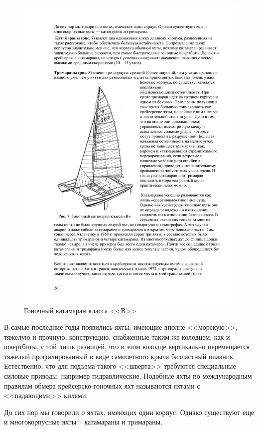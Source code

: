 \documentclass[a4paper, 12pt, twoside, final]{scrbook}
\begin{document}
\begin{figure}%
\centering\includegraphics[scale=0.9]{Katamaran_class_B}
\caption{Гоночный катамаран класса <<В>>}
\label{fig:7}
\end{figure}%


В самые последние годы появились яхты, имеющие вполне <<морскую>>, тяжелую
и прочную, конструкцию, снабженные таким же колодцем, как и швертботы,
с той лишь разницей, что в этом колодце вертикально перемещается тяжелый
профилированный в виде самолетного крыла балластный плавник. Естественно,
что для подъема такого <<шверта>> требуются специальные силовые приводы,
например гидравлические. Подобные яхты по международным правилам обмера
крейсерско-гоночных яхт называются яхтами с <<падающими>> килями.

До сих пор мы говорили о яхтах, имеющих один корпус. Однако существуют
еще и многокорпусные яхты \--- катамараны и тримараны.
\end{document}
